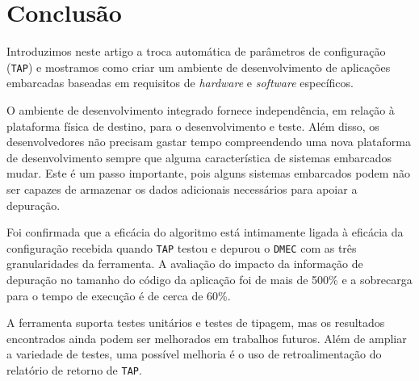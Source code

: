 \documentclass[conference]{IEEEtran}
\begin{document}
\section{Conclusão}
\label{sec:conclusao}
Introduzimos neste artigo a troca automática de parâmetros de configuração (\texttt{TAP}) e mostramos como criar um ambiente de desenvolvimento de aplicações embarcadas baseadas em requisitos de \textit{hardware}  e \textit{software} específicos.

O ambiente de desenvolvimento integrado fornece independência, em relação à plataforma física de destino, para o desenvolvimento e teste. Além disso, os desenvolvedores não precisam gastar tempo compreendendo uma nova plataforma de desenvolvimento sempre que alguma característica de sistemas embarcados mudar. Este é um passo importante, pois alguns sistemas embarcados podem não ser capazes de armazenar os dados adicionais necessários para apoiar a depuração. 

Foi confirmada que a eficácia do algoritmo está intimamente ligada à eficácia da configuração recebida quando \texttt{TAP} testou e depurou o \texttt{DMEC} com as três granularidades da ferramenta. A avaliação do impacto da informação de depuração no tamanho do código da aplicação foi de mais de 500\% e a sobrecarga para o tempo de execução é de cerca de 60\%.

A ferramenta suporta testes unitários e testes de tipagem, mas os resultados encontrados ainda podem ser melhorados em trabalhos futuros. Além de ampliar a variedade de testes, uma possível melhoria é o uso de retroalimentação do relatório de retorno de \texttt{TAP}.




\end{document}
